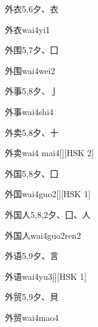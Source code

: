 \begin{entry}{外衣}{5,6}{⼣、⾐}
  \begin{phonetics}{外衣}{wai4yi1}
  \end{phonetics}
\end{entry}

\begin{entry}{外围}{5,7}{⼣、⼞}
  \begin{phonetics}{外围}{wai4wei2}
  \end{phonetics}
\end{entry}

\begin{entry}{外事}{5,8}{⼣、⼅}
  \begin{phonetics}{外事}{wai4shi4}
  \end{phonetics}
\end{entry}

\begin{entry}{外卖}{5,8}{⼣、⼗}
  \begin{phonetics}{外卖}{wai4 mai4}[][HSK 2]
  \end{phonetics}
\end{entry}

\begin{entry}{外国}{5,8}{⼣、⼞}
  \begin{phonetics}{外国}{wai4guo2}[][HSK 1]
  \end{phonetics}
\end{entry}

\begin{entry}{外国人}{5,8,2}{⼣、⼞、⼈}
  \begin{phonetics}{外国人}{wai4guo2ren2}
  \end{phonetics}
\end{entry}

\begin{entry}{外语}{5,9}{⼣、⾔}
  \begin{phonetics}{外语}{wai4yu3}[][HSK 1]
  \end{phonetics}
\end{entry}

\begin{entry}{外贸}{5,9}{⼣、⾙}
  \begin{phonetics}{外贸}{wai4mao4}
  \end{phonetics}
\end{entry}

